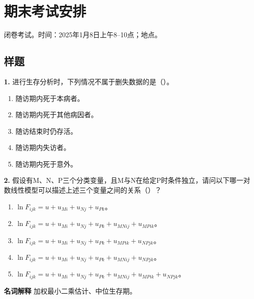 \section{期末考试安排}
闭卷考试。时间：2025年1月8日上午8--10点；地点。
\subsection{样题}
\textbf{1.} 进行生存分析时，下列情况不属于删失数据的是（\quad）。
\begin{enumerate}[label=\Alph*.]
\item 随访期内死于本病者。
\item 随访期内死于其他病因者。
\item 随访结束时仍存活。
\item 随访期内失访者。
\item 随访期内死于意外。
\end{enumerate}
\textbf{2.} 假设有M、N、P三个分类变量，且M与N在给定P时条件独立，请问以下哪一对数线性模型可以描述上述三个变量之间的关系（\quad）？
\begin{enumerate}[label=\Alph*.]
\item $\ln F_{ijk}=u+u_{Mi}+u_{Nj}+u_{Pk}$。
\item $\ln F_{ijk}=u+u_{Mi}+u_{Nj}+u_{Pk}+u_{MNij}+u_{MPik}$。
\item $\ln F_{ijk}=u+u_{Mi}+u_{Nj}+u_{Pk}+u_{MPik}+u_{NPjk}$。
\item $\ln F_{ijk}=u+u_{Mi}+u_{Nj}+u_{Pk}+u_{MNij}+u_{NPjk}$。
\item $\ln F_{ijk}=u+u_{Mi}+u_{Nj}+u_{Pk}+u_{MNij}+u_{MPik}+u_{NPjk}$。
\end{enumerate}
\textbf{名词解释} 加权最小二乘估计、中位生存期。

